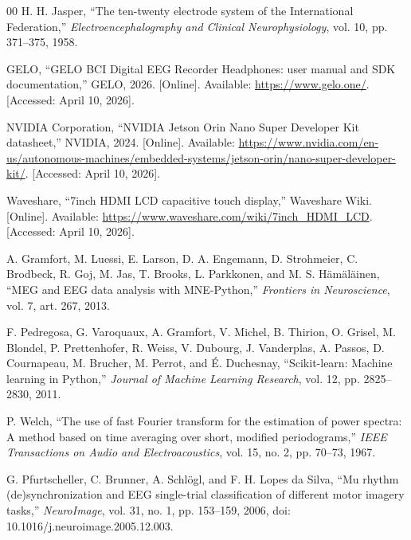 \begin{thebibliography}{00}
H. H. Jasper, ``The ten-twenty electrode system of the International Federation,''
\textit{Electroencephalography and Clinical Neurophysiology}, vol. 10,
pp. 371--375, 1958.


GELO, ``GELO BCI Digital EEG Recorder Headphones: user manual and SDK
documentation,'' GELO, 2026. [Online]. Available: \url{https://www.gelo.one/}.
[Accessed: April 10, 2026].

NVIDIA Corporation, ``NVIDIA Jetson Orin Nano Super Developer Kit datasheet,'' NVIDIA,
2024. [Online]. Available:
\url{https://www.nvidia.com/en-us/autonomous-machines/embedded-systems/jetson-orin/nano-super-developer-kit/}.
[Accessed: April 10, 2026].


Waveshare, ``7inch HDMI LCD capacitive touch display,'' Waveshare Wiki. [Online].
Available: \url{https://www.waveshare.com/wiki/7inch_HDMI_LCD}.
[Accessed: April 10, 2026].

A. Gramfort, M. Luessi, E. Larson, D. A. Engemann, D. Strohmeier, C. Brodbeck,
R. Goj, M. Jas, T. Brooks, L. Parkkonen, and M. S. H\"{a}m\"{a}l\"{a}inen,
``MEG and EEG data analysis with MNE-Python,'' \textit{Frontiers in Neuroscience},
vol. 7, art. 267, 2013.

F. Pedregosa, G. Varoquaux, A. Gramfort, V. Michel, B. Thirion, O. Grisel,
M. Blondel, P. Prettenhofer, R. Weiss, V. Dubourg, J. Vanderplas, A. Passos,
D. Cournapeau, M. Brucher, M. Perrot, and \'{E}. Duchesnay, ``Scikit-learn:
Machine learning in Python,'' \textit{Journal of Machine Learning Research},
vol. 12, pp. 2825--2830, 2011.


P. Welch, ``The use of fast Fourier transform for the estimation of power spectra:
A method based on time averaging over short, modified periodograms,''
\textit{IEEE Transactions on Audio and Electroacoustics}, vol. 15, no. 2,
pp. 70--73, 1967.

G. Pfurtscheller, C. Brunner, A. Schl\"{o}gl, and F. H. Lopes da Silva, ``Mu rhythm
(de)synchronization and EEG single-trial classification of different motor imagery
tasks,'' \textit{NeuroImage}, vol. 31, no. 1, pp. 153--159, 2006,
doi: 10.1016/j.neuroimage.2005.12.003.


\end{thebibliography}
